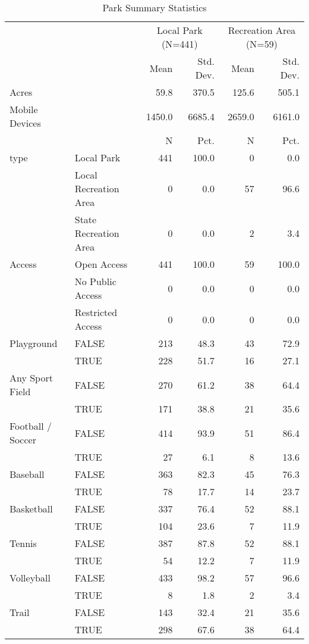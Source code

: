 \documentclass[3p, authoryear, review]{elsarticle} %
\begin{document}
\begin{table}

\caption{\label{tab:parkstable}Park Summary Statistics}
\centering
\begin{tabular}[t]{llrrrr}
\toprule
\multicolumn{2}{c}{ } & \multicolumn{2}{c}{Local Park (N=441)} & \multicolumn{2}{c}{Recreation Area (N=59)} \\
\cmidrule(l{3pt}r{3pt}){3-4} \cmidrule(l{3pt}r{3pt}){5-6}
  &    & Mean & Std. Dev. & Mean  & Std. Dev. \\
\midrule
Acres &  & 59.8 & 370.5 & 125.6 & 505.1\\
Mobile Devices &  & 1450.0 & 6685.4 & 2659.0 & 6161.0\\
\midrule
 &  & N & Pct. & N & Pct.\\
type & Local Park & 441 & 100.0 & 0 & 0.0\\
 & Local Recreation Area & 0 & 0.0 & 57 & 96.6\\
 & State Recreation Area & 0 & 0.0 & 2 & 3.4\\
Access & Open Access & 441 & 100.0 & 59 & 100.0\\
 & No Public Access & 0 & 0.0 & 0 & 0.0\\
 & Restricted Access & 0 & 0.0 & 0 & 0.0\\
Playground & FALSE & 213 & 48.3 & 43 & 72.9\\
 & TRUE & 228 & 51.7 & 16 & 27.1\\
Any Sport Field & FALSE & 270 & 61.2 & 38 & 64.4\\
 & TRUE & 171 & 38.8 & 21 & 35.6\\
Football / Soccer & FALSE & 414 & 93.9 & 51 & 86.4\\
 & TRUE & 27 & 6.1 & 8 & 13.6\\
Baseball & FALSE & 363 & 82.3 & 45 & 76.3\\
 & TRUE & 78 & 17.7 & 14 & 23.7\\
Basketball & FALSE & 337 & 76.4 & 52 & 88.1\\
 & TRUE & 104 & 23.6 & 7 & 11.9\\
Tennis & FALSE & 387 & 87.8 & 52 & 88.1\\
 & TRUE & 54 & 12.2 & 7 & 11.9\\
Volleyball & FALSE & 433 & 98.2 & 57 & 96.6\\
 & TRUE & 8 & 1.8 & 2 & 3.4\\
Trail & FALSE & 143 & 32.4 & 21 & 35.6\\
 & TRUE & 298 & 67.6 & 38 & 64.4\\
\bottomrule
\end{tabular}
\end{table}
\end{document}
